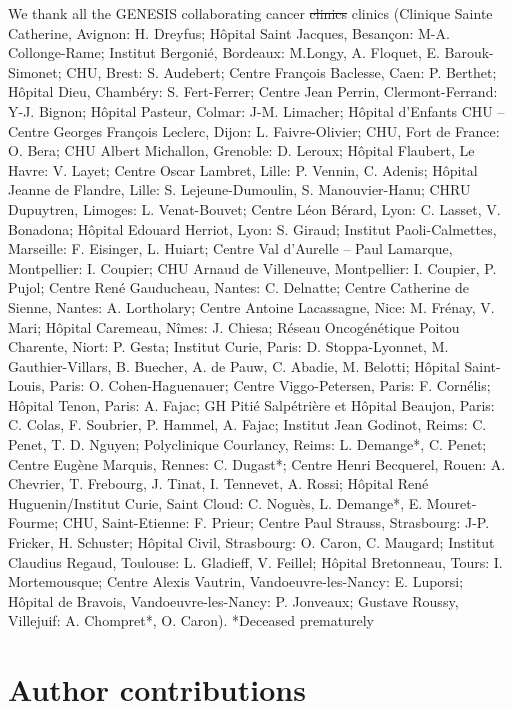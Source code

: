\documentclass[10pt,letterpaper]{article}
\providecommand{\DIFdeltex}[1]{{\protect\color{red}\sout{#1}}}                      %
\providecommand{\DIFdelbegin}{} %
\providecommand{\DIFdelend}{} %
\providecommand{\DIFdel}[1]{\texorpdfstring{\DIFdeltex{#1}}{}} %
\newcommand{\DIFscaledelfig}{0.5}
\newlength{\DIFdelgraphicswidth} %
\newlength{\DIFdelgraphicsheight} %
\newcommand{\DIFdelincludegraphics}[2][]{%
\sbox{\DIFdelgraphicsbox}{\DIFOincludegraphics[#1]{#2}}%
\settoboxwidth{\DIFdelgraphicswidth}{\DIFdelgraphicsbox} %
\settoboxtotalheight{\DIFdelgraphicsheight}{\DIFdelgraphicsbox} %
\scalebox{\DIFscaledelfig}{%
\parbox[b]{\DIFdelgraphicswidth}{\usebox{\DIFdelgraphicsbox}\\[-\baselineskip] \rule{\DIFdelgraphicswidth}{0em}}\llap{\resizebox{\DIFdelgraphicswidth}{\DIFdelgraphicsheight}{%
\setlength{\unitlength}{\DIFdelgraphicswidth}%
\begin{picture}(1,1)%
\thicklines\linethickness{2pt} %
{\color[rgb]{1,0,0}\put(0,0){\framebox(1,1){}}}%
{\color[rgb]{1,0,0}\put(0,0){\line( 1,1){1}}}%
{\color[rgb]{1,0,0}\put(0,1){\line(1,-1){1}}}%
\end{picture}%
}\hspace*{3pt}}} %
} %
\DeclareRobustCommand{\DIFdelbegin}{\DIFOdelbegin \let\includegraphics\DIFdelincludegraphics} %
\DeclareRobustCommand{\DIFdelend}{\DIFOaddend \let\includegraphics\DIFOincludegraphics} %
\begin{document}
We thank all the GENESIS collaborating cancer \DIFdelbegin \DIFdel{clinics }\DIFdelend clinics (Clinique Sainte Catherine, Avignon: H. Dreyfus; Hôpital Saint Jacques, Besançon: M-A. Collonge-Rame; Institut Bergonié, Bordeaux: M.Longy, A. Floquet, E. Barouk-Simonet; CHU, Brest: S. Audebert; Centre François Baclesse, Caen: P. Berthet; Hôpital Dieu, Chambéry: S. Fert-Ferrer; Centre Jean Perrin, Clermont-Ferrand: Y-J. Bignon; Hôpital Pasteur, Colmar: J-M. Limacher; Hôpital d’Enfants CHU – Centre Georges François Leclerc, Dijon: L. Faivre-Olivier; CHU, Fort de France: O. Bera; CHU Albert Michallon, Grenoble: D. Leroux; Hôpital Flaubert, Le Havre: V. Layet; Centre Oscar Lambret, Lille: P. Vennin, C. Adenis; Hôpital Jeanne de Flandre, Lille: S. Lejeune-Dumoulin, S. Manouvier-Hanu; CHRU Dupuytren, Limoges: L. Venat-Bouvet; Centre Léon Bérard, Lyon: C. Lasset, V. Bonadona; Hôpital Edouard Herriot, Lyon: S. Giraud; Institut Paoli-Calmettes, Marseille: F. Eisinger, L. Huiart; Centre Val d’Aurelle – Paul Lamarque, Montpellier: I. Coupier; CHU Arnaud de Villeneuve, Montpellier: I. Coupier, P. Pujol; Centre René Gauducheau, Nantes: C. Delnatte; Centre Catherine de Sienne, Nantes: A. Lortholary; Centre Antoine Lacassagne, Nice: M. Frénay, V. Mari; Hôpital Caremeau, Nîmes: J. Chiesa; Réseau Oncogénétique Poitou Charente, Niort: P. Gesta; Institut Curie, Paris: D. Stoppa-Lyonnet, M. Gauthier-Villars, B. Buecher, A. de Pauw, C. Abadie, M. Belotti; Hôpital Saint-Louis, Paris: O. Cohen-Haguenauer; Centre Viggo-Petersen, Paris: F. Cornélis; Hôpital Tenon, Paris: A. Fajac; GH Pitié Salpétrière et Hôpital Beaujon, Paris: C. Colas, F. Soubrier, P. Hammel, A. Fajac; Institut Jean Godinot, Reims: C. Penet, T. D. Nguyen; Polyclinique Courlancy, Reims: L. Demange*, C. Penet; Centre Eugène Marquis, Rennes: C. Dugast*; Centre Henri Becquerel, Rouen: A. Chevrier, T. Frebourg, J. Tinat, I. Tennevet, A. Rossi; Hôpital René Huguenin/Institut Curie, Saint Cloud: C. Noguès, L. Demange*, E. Mouret-Fourme; CHU, Saint-Etienne: F. Prieur; Centre Paul Strauss, Strasbourg: J-P. Fricker, H. Schuster; Hôpital Civil, Strasbourg: O. Caron, C. Maugard; Institut Claudius Regaud, Toulouse: L. Gladieff, V. Feillel; Hôpital Bretonneau, Tours: I. Mortemousque; Centre Alexis Vautrin, Vandoeuvre-les-Nancy: E. Luporsi; Hôpital de Bravois, Vandoeuvre-les-Nancy: P. Jonveaux; Gustave Roussy, Villejuif: A. Chompret*, O. Caron).
*Deceased prematurely

\section*{Author contributions}
\end{document}

